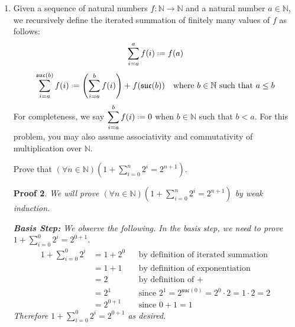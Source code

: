 \documentclass[12pt]{article}
\newcommand{\defeq}{\mathrel{\vcenter{\baselineskip0.5ex \lineskiplimit0pt
                     \hbox{\scriptsize.}\hbox{\scriptsize.}}}=}
\newcommand{\suc}{\mathfrak{suc}}
\newcommand{\N}{\mathbb{N}}
\theoremstyle{proofstyle}
\newtheorem*{proof*}{Proof}
\begin{document}
\begin{enumerate}[left=0pt, itemsep=2em, parsep=1em]
\begin{proof*}
We can therefore conclude $(\forall z \in \N)(x \cdot (y + z) = (x \cdot y) + (x \cdot z))$, and since $x$ and $y$ were arbitrary, $(\forall x, y, z \in \N)(x \cdot (y + z) = (x \cdot y) + (x \cdot z))$.
\end{proof*}

\newpage

\item Given a sequence of natural numbers $f : \N \to \N$ and a natural number $a \in \N$, we recursively define the iterated summation of finitely many values of $f$ as follows:
\[
  \sum_{i=a}^{a} f(i) \defeq f(a)
\]
\[
  \sum_{i=a}^{\suc(b)} f(i) \defeq \left(\sum_{i=a}^{b} f(i)\right) + f(\suc(b))
  \quad \text{where } b \in \N \text{ such that } a \leq b
\]
For completeness, we say $\displaystyle\sum_{i=a}^{b} f(i) \defeq 0$ when $b \in \N$ such that $b < a$. For this problem, you may also assume associativity and commutativity of multiplication over $\N$.

Prove that $\displaystyle(\forall n \in \N)\!\left(1 + \sum_{i=0}^{n} 2^i = 2^{n+1}\right)$.

\begin{proof*}
We will prove $(\forall n \in \N)\!\left(1 + \displaystyle\sum_{i=0}^{n} 2^i = 2^{n+1}\right)$ by weak induction.

\medskip
\textbf{Basis Step:}
We observe the following. In the basis step, we need to prove $1 + \displaystyle\sum_{i=0}^{0} 2^i = 2^{0+1}$.
\begin{align*}
  1 + \sum_{i=0}^{0} 2^i
    &= 1 + 2^0 &&\text{by definition of iterated summation} \\
    &= 1 + 1   &&\text{by definition of exponentiation} \\
    &= 2       &&\text{by definition of +} \\
    &= 2^1     &&\text{since }2^1 = 2^{\suc(0)} = 2^0 \cdot 2 = 1 \cdot 2 = 2\\
    &= 2^{0+1} &&\text{since }0 + 1 = 1
\end{align*}
Therefore $1 + \displaystyle\sum_{i=0}^{0} 2^i = 2^{0+1}$ as desired.


\end{proof*}
\end{enumerate}
\end{document}
